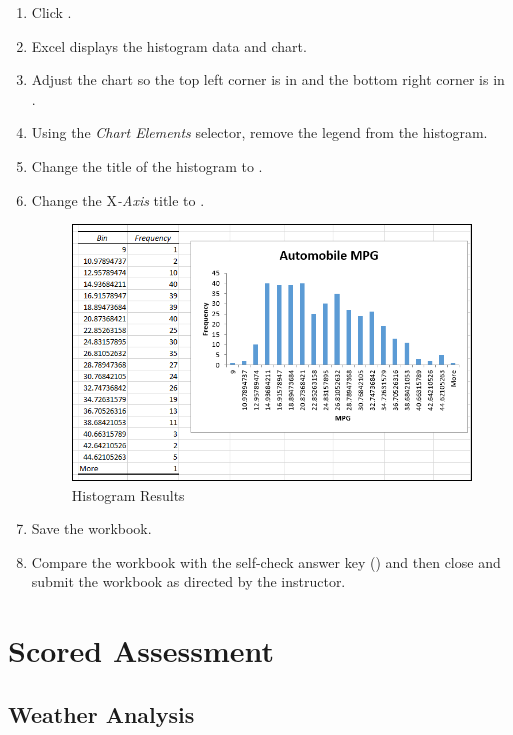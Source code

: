 \begin{enumerate}[resume]
	\item Click .
	\item Excel displays the histogram data and chart. 
	\item Adjust the chart so the top left corner is in  and the bottom right corner is in .
	\item Using the \textit{Chart Elements} selector, remove the legend from the histogram.
	\item Change the title of the histogram to .
	\item Change the X\textit{-Axis} title to .

	\begin{figure}[H]
		\centering
		\includegraphics[width=\maxwidth{.95\linewidth}]{gfx/ch09_fig77}
		\caption{Histogram Results}
		\label{09:fig77}
	\end{figure}
	\item Save the  workbook.
	\item Compare the workbook with the self-check answer key () and then close and submit the  workbook as directed by the instructor.

\end{enumerate}

\section{Scored Assessment}

\subsection{Weather Analysis}

